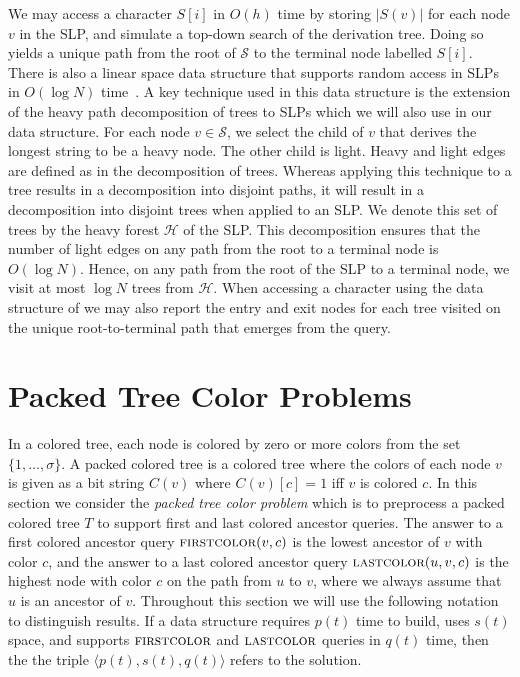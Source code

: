 \documentclass[11pt]{article}
\newcommand{\str}{\ensuremath{S} }
\newcommand{\tree}{\ensuremath{T}}
\newcommand{\slp}{\ensuremath{\mathcal{S}} }
\newcommand{\fca}{\ensuremath{\textsc{firstcolor}}}
\newcommand{\lca}{\ensuremath{\textsc{lastcolor}}}
\newcommand{\hf}{\ensuremath{\mathcal{H}}}
\begin{document}
We may access a character $\str[i]$ in $O(h)$ time by storing $|S(v)|$ for each node $v$ in the SLP, and simulate a top-down search of the derivation tree. Doing so yields a unique path from the root of $\slp$ to the terminal node labelled $\str[i]$. There is also a linear space data structure that supports random access in SLPs in $O(\log N)$ time~\cite{bille2011random}. A key technique used in this data structure is the extension of the heavy path decomposition of trees to SLPs which we will also use in our data structure. For each node $v \in \slp$, we select the child of $v$ that derives the longest string to be a heavy node. The other child is light. Heavy and light edges are defined as in the decomposition of trees. Whereas applying this technique to a tree results in a decomposition into disjoint paths, it will result in a decomposition into disjoint trees when applied to an SLP. We denote this set of trees by the heavy forest $\hf$ of the SLP. This decomposition ensures that the number of light edges on any path from the root to a terminal node is $O(\log N)$. Hence, on any path from the root of the SLP to a terminal node, we visit at most $\log N$ trees from $\hf$. When accessing a character using the data structure of \cite{bille2011random} we may also report the entry and exit nodes for each tree visited on the unique root-to-terminal path that emerges from the query.

\section{Packed Tree Color Problems}
In a colored tree, each node is colored by zero or more colors from the set $\{1,\ldots,\sigma\}$. A packed colored tree is a colored tree where the colors of each node $v$ is given as a bit string $C(v)$ where $C(v)[c]=1$ iff $v$ is colored $c$. In this section we consider the \textit{packed tree color problem} which is to preprocess a packed colored tree $\tree$ to support  first and last colored ancestor queries. The answer to a first colored ancestor query $\fca(v,c)$ is the lowest ancestor of $v$ with color $c$, and the answer to a last colored ancestor query $\lca(u,v,c)$ is the highest node with color $c$ on the path from $u$ to $v$, where we always assume that $u$ is an ancestor of $v$. Throughout this section we will use the following notation to distinguish results. If a data structure requires $p(t)$ time to build, uses $s(t)$ space, and supports $\fca$ and $\lca$ queries in $q(t)$ time, then the the triple $\langle p(t), s(t), q(t)\rangle$ refers to the solution.
\end{document}
